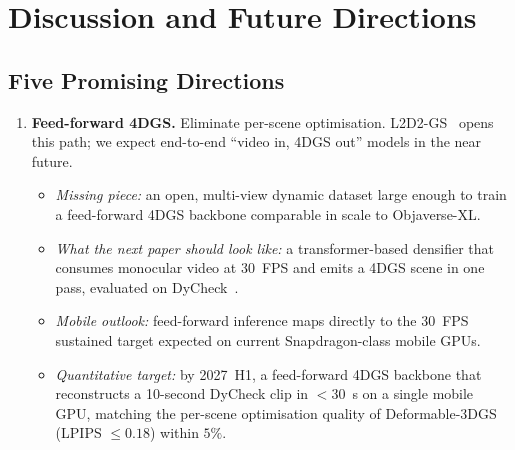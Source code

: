 \section{Discussion and Future Directions}
\label{sec:discussion}

\subsection{Five Promising Directions}

\begin{enumerate}
  \item \textbf{Feed-forward 4DGS.} Eliminate per-scene
        optimisation. L2D2-GS~\cite{song2026l2d2gs} opens this path;
        we expect end-to-end ``video in, 4DGS out'' models in the
        near future.
        \begin{itemize}
        \item \textit{Missing piece:} an open, multi-view dynamic
              dataset large enough to train a feed-forward 4DGS
              backbone comparable in scale to Objaverse-XL.
        \item \textit{What the next paper should look like:} a
              transformer-based densifier that consumes monocular
              video at 30~FPS and emits a 4DGS scene in one pass,
              evaluated on DyCheck~\cite{gao2022dycheck}.
        \item \textit{Mobile outlook:} feed-forward inference
              maps directly to the
              30~FPS sustained target expected on
              current Snapdragon-class mobile GPUs.
        \item \textit{Quantitative target:} by 2027~H1, a feed-forward
              4DGS backbone that reconstructs a 10-second DyCheck clip
              in $<$30~s on a single mobile GPU, matching the
              per-scene optimisation quality of Deformable-3DGS
              (LPIPS $\le 0.18$) within $5\%$.
        \end{itemize}


\end{enumerate}
